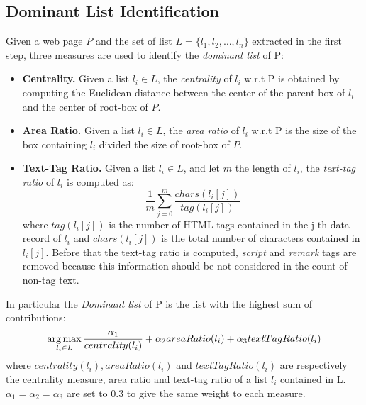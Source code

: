 \subsection{Dominant List Identification}

Given a web page $P$ and the set of list $L=\{l_1,l_2,\ldots,l_n\}$ extracted in the first step, three measures are used to identify the \textit{dominant list} of P: 
\begin{itemize}
\item \textbf{Centrality.} Given a list $l_i \in L$, the \emph{centrality} of $l_i$ w.r.t P is obtained by computing the Euclidean distance between the center of the parent-box of $l_i$ and the center of root-box of $P$.
\item \textbf{Area Ratio.} Given a list $l_i \in L$, the \emph{area ratio} of $l_i$ w.r.t P is the size of the box containing $l_i$ divided the size of root-box of $P$.
\item \textbf{Text-Tag Ratio.}  Given a list $l_i \in L$, and let $m$ the length of $l_i$, the \emph{text-tag ratio} of $l_i$ is computed as:
\begin{equation}
 \frac{1}{m}\sum_{j=0}^m \frac{chars(l_i[j])}{tag(l_i[j])}
\end{equation}
where $tag(l_i[j])$ is the number of HTML tags contained in the j-th data record of $l_i$ and $chars(l_i[j])$ is the total number of characters contained in $l_i[j]$. 
Before that the text-tag ratio is computed, \textit{script} and \textit{remark} tags
are removed because this information should be not considered in the count of non-tag text. 
\end{itemize}
In particular the \textit{Dominant list} of P is the list with  the highest sum of contributions:
\begin{equation}
\operatorname*{arg\,max}_{{l_i \in L}} \frac{\alpha_1}{centrality(l_i)} + \alpha_2areaRatio(l_i)+ \alpha_3textTagRatio(l_i)
\end{equation}
where $centrality(l_i), areaRatio(l_i)$ and $textTagRatio(l_i)$ are respectively the centrality measure, area ratio and text-tag ratio of a list $l_i$ contained in L. $\alpha_1=\alpha_2=\alpha_3$ are set to $0.3$ to give the same weight to each measure.

%

